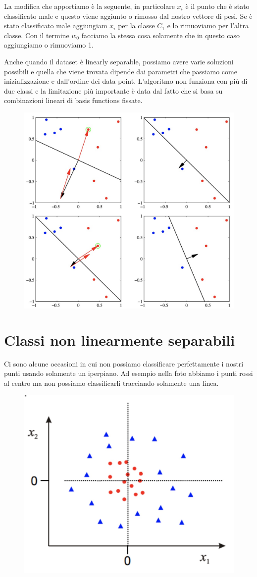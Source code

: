 \documentclass[14pt]{extreport}
\begin{document}
La modifica che apportiamo è la seguente, in particolare $x_i$ è il punto che è stato classificato male e questo viene aggiunto o rimosso dal nostro
vettore di pesi. Se è stato classificato male aggiungiam $x_i$ per la classe $C_1$ e lo rimuoviamo per l'altra classe. Con il termine $w_0$ facciamo
la stessa cosa solamente che in questo caso aggiungiamo o rimuoviamo 1.

Anche quando il dataset è linearly separable, possiamo avere varie soluzioni possibili e quella che viene trovata dipende dai parametri che passiamo
come inizializzazione e dall'ordine dei data point. L'algoritmo non funziona con più di due classi e la limitazione più importante è data dal fatto
che si basa su combinazioni lineari di basis functions fissate.

\begin{figure}[H]
	\centering
	\includegraphics[width=0.5\linewidth]{198.jpeg}
\end{figure}

\section{Classi non linearmente separabili}

Ci sono alcune occasioni in cui non possiamo classificare perfettamente i nostri punti usando solamente un iperpiano. Ad esempio nella foto abbiamo i
punti rossi al centro ma non possiamo classificarli tracciando solamente una linea.

\begin{figure}[H]
	\centering
	\includegraphics[width=0.4\linewidth]{153.jpeg}
\end{figure}
\end{document}
